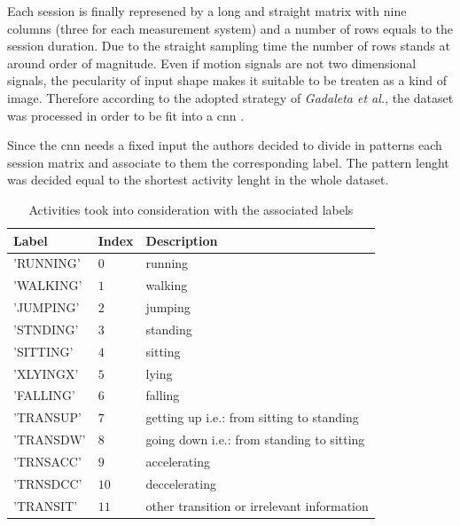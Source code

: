 Each session is finally represened by a long and straight matrix with nine columns (three for each measurement system) and a number of rows equals to the session duration. Due to the straight sampling time the number of rows stands at around  order of magnitude. Even if motion signals are not two dimensional signals, the pecularity of input shape makes it suitable to be treaten as a kind of image. Therefore according to the adopted strategy of \textit{Gadaleta et al.}, the dataset was processed in order to be fit into a \gls{cnn} \cite{Gadaleta-2018}.


Since the \gls{cnn} needs a fixed input the authors decided to divide in patterns each session matrix and associate to them the corresponding label. The pattern lenght was decided equal to the shortest activity lenght in the whole dataset.



\begin{table}[b]
\small
	\centering
		\renewcommand{\arraystretch}{1}%
	\begin{tabular}{@{}lll@{}}
	\toprule
	Label & Index & Description\\ \midrule
	'RUNNING' & $0$ & running \\
	'WALKING' & $1$ & walking \\
	'JUMPING' & $2$ & jumping  \\
	'STNDING' & $3$ & standing \\ 
	'SITTING' & $4$ & sitting\\
	'XLYINGX' & $5$ & lying \\
	'FALLING' & $6$ & falling \\
	'TRANSUP' & $7$ & getting up i.e.: from sitting to standing \\
	'TRANSDW' & $8$ & going down i.e.: from standing to sitting\\
	'TRNSACC' & $9$ & accelerating\\
	'TRNSDCC' & $10$ & deccelerating\\
	'TRANSIT' & $11$ & other transition or irrelevant information\\
	\bottomrule
	\end{tabular}
	\caption{Activities took into consideration with the associated labels}
	\label{tab:label}
\end{table}



